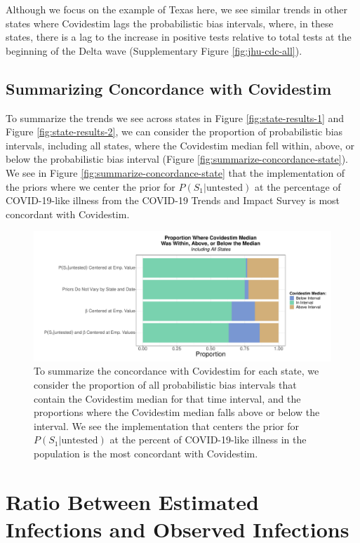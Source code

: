 \documentclass[12pt,twoside]{smiththesis}
\begin{document}
Although we focus on the example of Texas here, we see similar trends in other states where Covidestim lags the probabilistic bias intervals, where, in these states, there is a lag to the increase in positive tests relative to total tests at the beginning of the Delta wave (Supplementary Figure \ref{fig:jhu-cdc-all}).

\hypertarget{summarizing-concordance-with-covidestim}{%
\subsection{Summarizing Concordance with Covidestim}\label{summarizing-concordance-with-covidestim}}

To summarize the trends we see across states in Figure \ref{fig:state-results-1} and Figure \ref{fig:state-results-2}, we can consider the proportion of probabilistic bias intervals, including all states, where the Covidestim median fell within, above, or below the probabilistic bias interval (Figure \ref{fig:summarize-concordance-state}). We see in Figure \ref{fig:summarize-concordance-state} that the implementation of the priors where we center the prior for \(P(S_1|\text{untested})\) at the percentage of COVID-19-like illness from the COVID-19 Trends and Impact Survey is most concordant with Covidestim.
\begin{figure}
\includegraphics[width=1\linewidth]{figure/covidestim_concordance_state} \caption{\label{fig:summarize-concordance-state} To summarize the concordance with Covidestim for each state, we consider the proportion of all probabilistic bias intervals that contain the Covidestim median for that time interval, and the proportions where the Covidestim median falls above or below the interval. We see the implementation that centers the prior for $P(S_1|\text{untested})$ at the percent of COVID-19-like illness in the population is the most concordant with Covidestim.}\label{fig:unnamed-chunk-82}
\end{figure}
\hypertarget{ratio-between-estimated-infections-and-observed-infections}{%
\section{Ratio Between Estimated Infections and Observed Infections}\label{ratio-between-estimated-infections-and-observed-infections}}
\end{document}
